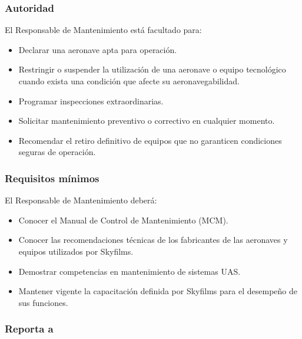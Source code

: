 \subsubsection*{Autoridad}

El Responsable de Mantenimiento está facultado para:

\begin{itemize}

\item Declarar una aeronave apta para operación.

\item Restringir o suspender la utilización de una aeronave o equipo tecnológico cuando exista una condición que afecte su aeronavegabilidad.

\item Programar inspecciones extraordinarias.

\item Solicitar mantenimiento preventivo o correctivo en cualquier momento.

\item Recomendar el retiro definitivo de equipos que no garanticen condiciones seguras de operación.

\end{itemize}


\subsubsection*{Requisitos mínimos}

El Responsable de Mantenimiento deberá:

\begin{itemize}

\item Conocer el Manual de Control de Mantenimiento (MCM).

\item Conocer las recomendaciones técnicas de los fabricantes de las aeronaves y equipos utilizados por Skyfilms.

\item Demostrar competencias en mantenimiento de sistemas UAS.

\item Mantener vigente la capacitación definida por Skyfilms para el desempeño de sus funciones.

\end{itemize}


\subsubsection*{Reporta a}

